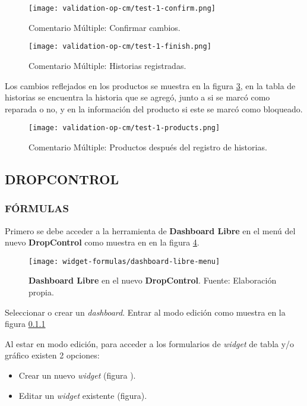 \begin{figure}[H]
	\centering
	\texttt{[image: validation-op-cm/test-1-confirm.png]}
	\caption{\label{fig:op-test-1-confirm-cm} Comentario Múltiple: Confirmar cambios.}
\end{figure}

\begin{figure}[H]
	\centering
	\texttt{[image: validation-op-cm/test-1-finish.png]}
	\caption{\label{fig:op-test-1-finish-cm} Comentario Múltiple: Historias registradas.}
\end{figure}

Los cambios reflejados en los productos se muestra en la figura \ref{fig:op-test-1-products-cm}, en la tabla de historias se encuentra la historia que se agregó, junto a si se marcó como reparada o no, y en la información del producto si este se marcó como bloqueado.

\begin{figure}[H]
	\centering
	\texttt{[image: validation-op-cm/test-1-products.png]}
	\caption{\label{fig:op-test-1-products-cm} Comentario Múltiple: Productos después del registro de historias.}
\end{figure}

\subsection{DROPCONTROL}

\subsubsection{FÓRMULAS}

Primero se debe acceder a la herramienta de \textbf{Dashboard Libre} en el menú del nuevo \textbf{DropControl} como muestra en en la figura \ref{fig:dash-libre-menu}.

\begin{figure}[H]
	\centering
	\texttt{[image: widget-formulas/dashboard-libre-menu]}
	\caption{\label{fig:dash-libre-menu} \textbf{Dashboard Libre} en el nuevo \textbf{DropControl}. Fuente: Elaboración propia.}
\end{figure}

Seleccionar o crear un \textit{dashboard}. Entrar al modo edición como muestra en la figura \ref{}
\iffalse foto con paso de como entrar al modo edicion \fi

Al estar en modo edición, para acceder a los formularios de \textit{widget} de tabla y/o gráfico existen 2 opciones:
\begin{itemize}
	\item Crear un nuevo \textit{widget} (figura ).
	\item Editar un \textit{widget} existente (figura).
\end{itemize}
\iffalse pasos para ingresar al formulario de ambas formas \fi

